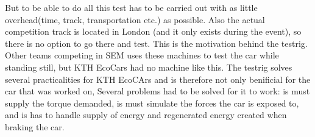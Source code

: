 But to be able to do all this test has to be carried out with as little overhead(time, track, transportation etc.) as possible. Also the actual competition track is located in London (and it only exists during the event), so there is no option to go there and test. This is the motivation behind the testrig. Other teams competing in SEM uses these machines to test the car while standing still, but KTH EcoCars had no machine like this. The testrig solves several practicalities for KTH EcoCArs and is therefore not only benificial for the car that was worked on, Several problems had to be solved for it to work: is must supply the torque demanded, is must simulate the forces the car is exposed to, and is has to handle supply of energy and regenerated energy created when braking the car.
